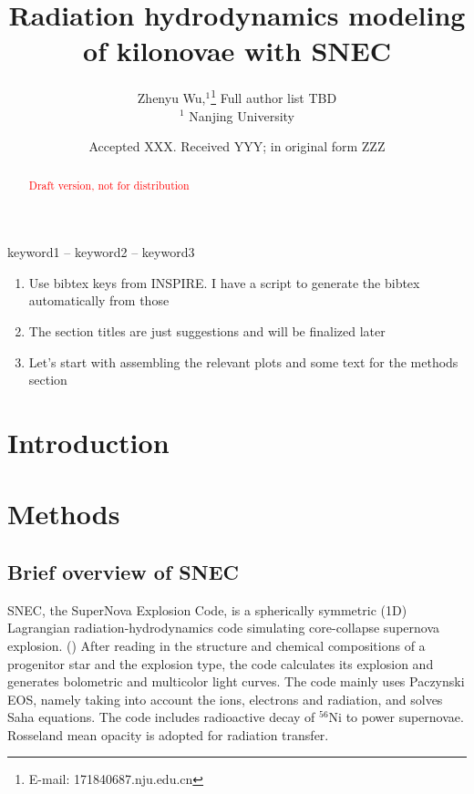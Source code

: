 \documentclass[fleqn,usenatbib]{mnras}
\title[Kilonova modeling with SNEC]{Radiation hydrodynamics modeling of kilonovae with SNEC}
\author[Z.~Wu]{
Zhenyu Wu,$^{1}$\thanks{E-mail: 171840687\@smail.nju.edu.cn}
Full author list TBD
\\
$^{1}$ Nanjing University\\
}
\date{Accepted XXX. Received YYY; in original form ZZZ}
\begin{document}
\label{firstpage}
\pagerange{\pageref{firstpage}--\pageref{lastpage}}
\maketitle

\begin{abstract}
\textcolor{red}{Draft version, not for distribution}
\end{abstract}

\begin{keywords}
keyword1 -- keyword2 -- keyword3
\end{keywords}


\begin{enumerate}
    \item Use bibtex keys from INSPIRE. I have a script to generate the bibtex automatically from those
    \item The section titles are just suggestions and will be finalized later
    \item Let's start with assembling the relevant plots and some text for the methods section
\end{enumerate}

\section{Introduction}

\section{Methods}

    \subsection{Brief overview of SNEC} 
    SNEC, the SuperNova Explosion Code, is a spherically symmetric (1D) Lagrangian radiation-hydrodynamics code simulating core-collapse supernova explosion. (\cite{morozova2015light}) After reading in the structure and chemical compositions of a progenitor star and the explosion type, the code calculates its explosion and generates bolometric and multicolor light curves. The code mainly uses Paczynski EOS, namely taking into account the ions, electrons and radiation, and solves Saha equations. The code includes radioactive decay of $^{56}$Ni to power supernovae. Rosseland mean opacity is adopted for radiation transfer. 
    
\end{document}
